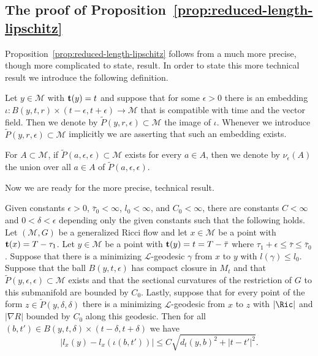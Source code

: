 \subsection{The proof of Proposition~{\ref{prop:reduced-length-lipschitz}}}

Proposition~\ref{prop:reduced-length-lipschitz} follows from a much more precise, though more
complicated to state, result. In order to state this more technical
result we introduce the following definition.

\begin{definition}\label{def:l-parabolic-neighborhood}
Let $y\in {\mathcal M}$ with ${\bf t}(y)=t$ and suppose that for
some $\epsilon>0$ there is an embedding $\iota\colon B(y,t,r)\times
(t-\epsilon,t+\epsilon)\to {\mathcal M}$ that is compatible with
time and the vector field. Then we denote by $\widetilde
P(y,r,\epsilon)\subset {\mathcal M}$ the image of $\iota$. Whenever
we introduce $\widetilde P(y,r,\epsilon)\subset {\mathcal M}$
implicitly we are asserting that such an embedding exists.

For  $A\subset {\mathcal M}$, if $\widetilde
P(a,\epsilon,\epsilon)\subset {\mathcal M}$ exists for every $a\in
A$, then we denote by $\nu_\epsilon(A)$ the union over all $a\in A$
of $\widetilde P(a,\epsilon,\epsilon)$.
\end{definition}


Now we are ready for the more precise, technical result.


\begin{proposition}\label{prop:reduced-length-lipschitz-precise}
\label{lipaty}
Given constants  $\epsilon>0$, $\bar\tau_0<\infty$, $l_0<\infty$,
and $C_0<\infty$, there are constants $ C<\infty$ and
$0<\delta<\epsilon$ depending only the  given constants  such that
the following holds. Let $({\mathcal M},G)$ be a generalized Ricci
flow and let $x\in{\mathcal M}$ be a point with ${\bf
t}(x)=T-\tau_1$. Let $y\in {\mathcal M}$ be a point with ${\bf
t}(y)=t=T-\bar\tau$ where $\tau_1+\epsilon\le \bar\tau\le
\bar\tau_0$. Suppose that there is a minimizing ${\mathcal
L}$-geodesic $\gamma$ from $x$ to $y$ with $l(\gamma)\le l_0$.
Suppose that the ball $B(y,t,\epsilon)$ has compact closure in
$M_{t}$ and that $\widetilde P(y,\epsilon,\epsilon)\subset {\mathcal
M}$ exists and that the sectional curvatures of the restriction of
$G$ to this submanifold are bounded by $C_0$. Lastly, suppose that
for every point of the form $z\in \widetilde P(y,\delta,\delta)$
there is a minimizing ${\mathcal L}$-geodesic from $x$ to $z$ with
$|\Ric|$ and $|\nabla R|$ bounded by $C_0$ along this geodesic.
Then for all $(b,t')\in B(y,t,\delta)\times(t-\delta,t+\delta)$ we
have
$$|l_x(y)-l_x(\iota(b,t'))|\le C\sqrt{d_{t}(y,b)^2+|t-t'|^2}.$$
\end{proposition}




